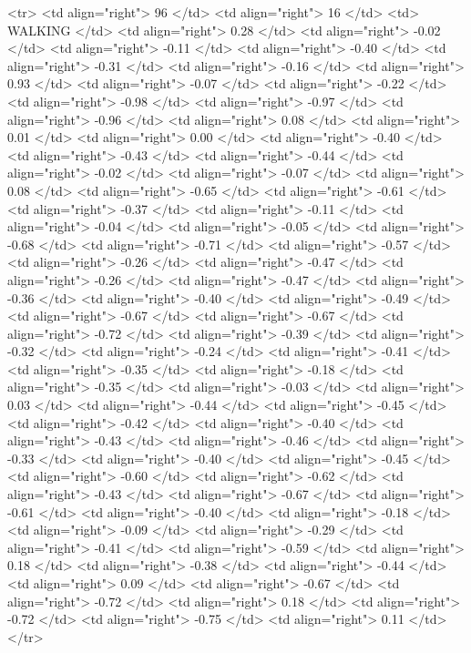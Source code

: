   <tr> <td align="right"> 96 </td> <td align="right">  16 </td> <td> WALKING </td> <td align="right"> 0.28 </td> <td align="right"> -0.02 </td> <td align="right"> -0.11 </td> <td align="right"> -0.40 </td> <td align="right"> -0.31 </td> <td align="right"> -0.16 </td> <td align="right"> 0.93 </td> <td align="right"> -0.07 </td> <td align="right"> -0.22 </td> <td align="right"> -0.98 </td> <td align="right"> -0.97 </td> <td align="right"> -0.96 </td> <td align="right"> 0.08 </td> <td align="right"> 0.01 </td> <td align="right"> 0.00 </td> <td align="right"> -0.40 </td> <td align="right"> -0.43 </td> <td align="right"> -0.44 </td> <td align="right"> -0.02 </td> <td align="right"> -0.07 </td> <td align="right"> 0.08 </td> <td align="right"> -0.65 </td> <td align="right"> -0.61 </td> <td align="right"> -0.37 </td> <td align="right"> -0.11 </td> <td align="right"> -0.04 </td> <td align="right"> -0.05 </td> <td align="right"> -0.68 </td> <td align="right"> -0.71 </td> <td align="right"> -0.57 </td> <td align="right"> -0.26 </td> <td align="right"> -0.47 </td> <td align="right"> -0.26 </td> <td align="right"> -0.47 </td> <td align="right"> -0.36 </td> <td align="right"> -0.40 </td> <td align="right"> -0.49 </td> <td align="right"> -0.67 </td> <td align="right"> -0.67 </td> <td align="right"> -0.72 </td> <td align="right"> -0.39 </td> <td align="right"> -0.32 </td> <td align="right"> -0.24 </td> <td align="right"> -0.41 </td> <td align="right"> -0.35 </td> <td align="right"> -0.18 </td> <td align="right"> -0.35 </td> <td align="right"> -0.03 </td> <td align="right"> 0.03 </td> <td align="right"> -0.44 </td> <td align="right"> -0.45 </td> <td align="right"> -0.42 </td> <td align="right"> -0.40 </td> <td align="right"> -0.43 </td> <td align="right"> -0.46 </td> <td align="right"> -0.33 </td> <td align="right"> -0.40 </td> <td align="right"> -0.45 </td> <td align="right"> -0.60 </td> <td align="right"> -0.62 </td> <td align="right"> -0.43 </td> <td align="right"> -0.67 </td> <td align="right"> -0.61 </td> <td align="right"> -0.40 </td> <td align="right"> -0.18 </td> <td align="right"> -0.09 </td> <td align="right"> -0.29 </td> <td align="right"> -0.41 </td> <td align="right"> -0.59 </td> <td align="right"> 0.18 </td> <td align="right"> -0.38 </td> <td align="right"> -0.44 </td> <td align="right"> 0.09 </td> <td align="right"> -0.67 </td> <td align="right"> -0.72 </td> <td align="right"> 0.18 </td> <td align="right"> -0.72 </td> <td align="right"> -0.75 </td> <td align="right"> 0.11 </td> </tr>

